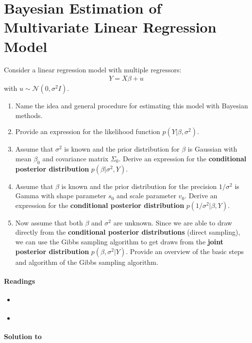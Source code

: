 \section[Bayesian Estimation of Multivariate Linear Regression Model]{Bayesian Estimation of Multivariate Linear Regression Model\label{ex:BayesianEstimationMultivariateLinearRegressionModel}}
Consider a linear regression model with multiple regressors:
\begin{align*}
Y = X\beta + u
\end{align*}
with \(u \sim \mathcal{N}(0, \sigma^2 I)\).

\begin{enumerate}

\item Name the idea and general procedure for estimating this model with Bayesian methods.

\item Provide an expression for the likelihood function \(p(Y|\beta,\sigma^2)\).

\item Assume that \(\sigma^2\) is known and the prior distribution for \(\beta \)
is Gaussian with mean \(\beta_0\) and covariance matrix \(\Sigma_{0}\).
Derive an expression for the \textbf{conditional posterior distribution} \(p(\beta|\sigma^2,Y)\).

\item Assume that \(\beta \) is known and the prior distribution for the precision \(1/\sigma^2\) is Gamma
with shape parameter \(s_0\) and scale parameter \(v_0\).
Derive an expression for the \textbf{conditional posterior distribution} \(p(1/\sigma^2|\beta,Y)\).

\item Now assume that both \(\beta \) and \(\sigma^2\) are unknown.
Since we are able to draw directly from the \textbf{conditional posterior distributions} (direct sampling),
  we can use the Gibbs sampling algorithm to get draws from the \textbf{joint posterior distribution} \(p(\beta,\sigma^2|Y)\).
Provide an overview of the basic steps and algorithm of the Gibbs sampling algorithm.
\end{enumerate}

\paragraph{Readings}
\begin{itemize}
	\item \textcite[Ch. 7.1]{Greenberg_2008_IntroductionBayesianEconometrics}
	\item \textcite[Ch. 3]{Koop_2003_BayesianEconometrics} 
\end{itemize}

\begin{solution}\textbf{Solution to }
\ifDisplaySolutions

\fi
\newpage
\end{solution}